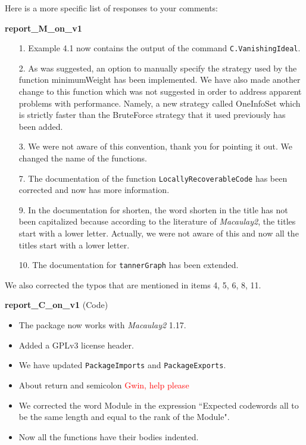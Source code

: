 \documentclass[12pt]{amsart}
\theoremstyle{plain}
\begin{document}
Here is a more specific list of responses to your comments:
\begin{center}
{\bf report\_M\_on\_v1}
\end{center}
\begin{itemize}
\item[\rm 1.] Example 4.1 now contains the output of the command {\tt C.VanishingIdeal}.
\item[\rm 2.] As was suggested, an option to manually specify the strategy used by the function {\ttfamily minimumWeight} has been implemented. We have also made another change to this function which was not suggested in order to address apparent problems with performance. Namely, a new strategy called {\ttfamily OneInfoSet} which is strictly faster than the {\ttfamily BruteForce} strategy that it used previously has been added.

\item[\rm 3.] We were not aware of this convention, thank you for pointing it out. We changed the name of the functions.
\item[\rm 7.] The documentation of the function {\tt LocallyRecoverableCode} has been corrected and now has more information.
\item[\rm 9.] In the documentation for shorten, the word shorten in the title has not been capitalized because according to the literature of {\it Macaulay2}, the titles start with a lower letter. Actually, we were not aware of this and now all the titles start with a lower letter.
\item[\rm 10.] The documentation for {\tt tannerGraph} has been extended.
\end{itemize}
We also corrected the typos that are mentioned in items 4, 5, 6, 8, 11.
\begin{center}
{\bf report\_C\_on\_v1} (Code)
\end{center}
\begin{itemize}
\item The package now works with {\it Macaulay2} 1.17.
\item Added a GPLv3 license header. 
\item We have updated {\tt PackageImports} and {\tt PackageExports}.
\item About return and semicolon \textcolor{red}{Gwin, help please}
\item We corrected the word Module in the expression ``Expected codewords all to be the same length and equal to the rank of the Module".
\item Now all the functions have their bodies indented.
\end{itemize}
\end{document}
